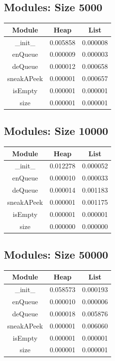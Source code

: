 \documentclass{article}
\begin{document}
\subsection{Modules: Size 5000}
\begin{table}[H]
    \begin{tabular}{c c c}
        Module & Heap & List \\ \hline
        \_init\_ & 0.005858 & 0.000008 \\ 
        enQueue & 0.000009 & 0.000003 \\
        deQueue & 0.000012 & 0.000658 \\
        sneakAPeek & 0.000001 & 0.000657 \\
        isEmpty & 0.000001 & 0.000001 \\
        size & 0.000001 & 0.000001 \\
    \end{tabular}
\end{table}

\subsection{Modules: Size 10000}
\begin{table}[H]
    \begin{tabular}{c c c}
        Module & Heap & List \\ \hline
        \_init\_ & 0.012278 & 0.000052 \\ 
        enQueue & 0.000010 & 0.000033 \\
        deQueue & 0.000014 & 0.001183 \\
        sneakAPeek & 0.000001 & 0.001175 \\
        isEmpty & 0.000001 & 0.000001 \\
        size & 0.000000 & 0.000000 \\
    \end{tabular}
\end{table}

\subsection{Modules: Size 50000}
\begin{table}[H]
    \begin{tabular}{c c c}
        Module & Heap & List \\ \hline
        \_init\_ & 0.058573 & 0.000193 \\ 
        enQueue & 0.000010 & 0.000006 \\
        deQueue & 0.000018 & 0.005876 \\
        sneakAPeek & 0.000001 & 0.006060 \\
        isEmpty & 0.000001 & 0.000001 \\
        size & 0.000001 & 0.000001 \\
    \end{tabular}
\end{table}
\end{document}
